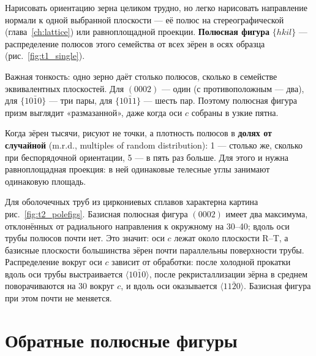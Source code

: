 Нарисовать ориентацию зерна целиком трудно, но легко нарисовать направление нормали к одной выбранной плоскости
--- её полюс на стереографической (глава~\ref{ch:lattice}) или равноплощадной проекции. \textbf{Полюсная фигура}
$\{hkil\}$ --- распределение полюсов этого семейства от всех зёрен в осях образца (рис.~\ref{fig:t1_single}).

Важная тонкость: одно зерно даёт столько полюсов, сколько в семействе эквивалентных плоскостей. Для $(0002)$ ---
один (с противоположным --- два), для $\{10\bar10\}$ --- три пары, для $\{10\bar11\}$ --- шесть пар. Поэтому полюсная фигура
призм выглядит «размазанной», даже когда оси $c$ собраны в узкие пятна.

Когда зёрен тысячи, рисуют не точки, а плотность полюсов в \textbf{долях от случайной} (m.r.d., multiples of random
distribution): 1 --- столько же, сколько при беспорядочной ориентации, 5 --- в пять раз больше. Для этого и нужна
равноплощадная проекция: в ней одинаковые телесные углы занимают одинаковую площадь.


Для оболочечных труб из циркониевых сплавов характерна картина рис.~\ref{fig:t2_polefigs}. Базисная полюсная
фигура $(0002)$ имеет два максимума, отклонённых от радиального направления к окружному на 30--40\textdegree;
вдоль оси трубы полюсов почти нет. Это значит: оси $c$ лежат около плоскости R--T, а базисные плоскости
большинства зёрен почти параллельны поверхности трубы. Распределение вокруг оси $c$ зависит от обработки: после
холодной прокатки вдоль оси трубы выстраивается $\langle10\bar10\rangle$, после рекристаллизации зёрна в среднем
поворачиваются на 30\textdegree{} вокруг $c$, и вдоль оси оказывается $\langle11\bar20\rangle$. Базисная фигура
при этом почти не меняется.

\section{Обратные полюсные фигуры}

